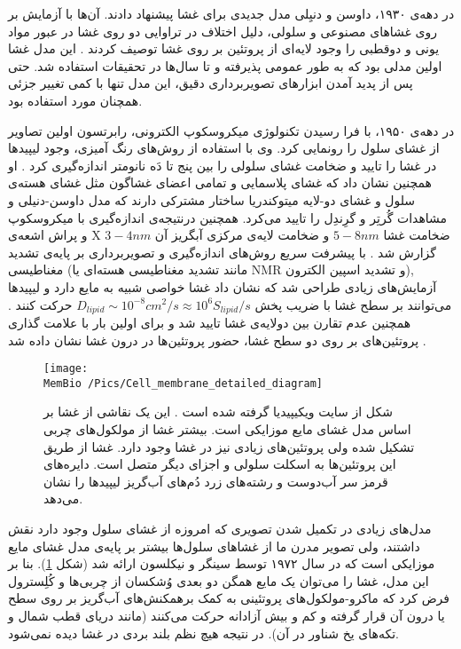 در دهه‌ی ۱۹۳۰، داوسن 
و دنیِلی 
مدل جدیدی برای غشا پیشنهاد دادند. آن‌ها با آزمایش بر روی غشا‌های مصنوعی و سلولی، دلیل اختلاف در تراوایی دو روی غشا در عبور مواد یونی و دوقطبی را وجود لایه‌ای از پروتئین بر روی غشا توصیف کردند
\cite{Danielli1935}. 
این مدل غشا اولین مدلی بود که به طور عمومی پذیرفته  و تا سال‌ها  در تحقیقات استفاده شد. حتی پس از  پدید آمدن ابزار‌های تصویر‌برداری دقیق، این مدل تنها با کمی تغییر جزئی همچنان مورد استفاده بود.

در دهه‌ی ۱۹۵۰، با فرا رسیدن تکنولوژی میکروسکوپ الکترونی، رابرتسون
 اولین تصاویر از غشای سلول را رونمایی کرد. وی با استفاده از روش‌های رنگ آمیزی، وجود لیپید‌ها
 در غشا را تایید و ضخامت غشای سلولی را بین پنج تا دَه نانومتر اندازه‌گیری کرد
\cite{ROBERTSON1959aa}.
او همچنین نشان داد که غشای پلاسمایی و تمامی اعضای غشاگون مثل غشای هسته‌ی سلول و غشای دو-لایه میتوکندریا
ساختار مشترکی دارند که مدل داوسن-دنیلی و مشاهدات گُرتِر و گرِندِل را تایید می‌کرد.
همچنین درنتیجه‌ی اندازه‌گیری با میکروسکوپ و پراش اشعه‌ی X ضخامت غشا 
 $5-8nm$
و ضخامت لایه‌ی مرکزی آبگریز آن
 $3-4nm$
گزارش شد
\cite{NelsonBook2004}.
با پیشرفت سریع روش‌های اندازه‌گیری و تصویربرداری بر پایه‌ی تشدید مغناطیسی (مانند تشدید مغناطیسی‌ هسته‌ای یا NMR
و تشدید اسپین الکترون), آزمایش‌های زیادی طراحی شد که نشان داد غشا  خواصی شبیه به مایع دارد
\cite{Edidin2003}
و لیپید‌ها می‌توانند بر سطح غشا با ضریب پخش
$D_{lipid}\sim 10^{-8}cm^2/s\approx 10^6S_{lipid}/s$
 حرکت کنند
\cite{NelsonBook2004,Chapman1975}.
همچنین عدم تقارن بین دولایه‌ی غشا تایید شد و برای اولین بار با علامت گذاری پروتئین‌های بر روی دو سطح غشا، حضور پروتئین‌ها در درون غشا نشان داده شد
\cite{Bretscher1973}.

\begin{figure}[t]
\begin{center}
\texttt{[image: \\MemBio /Pics/Cell\_membrane\_detailed\_diagram]}
\caption{
شکل از سایت ویکیپیدیا گرفته شده است
\cite{wikiCellMembrane}. این یک نقاشی از غشا بر اساس مدل غشای مایع موزایکی است. بیشتر غشا از مولکول‌های چربی تشکیل شده ولی پروتئین‌های زیادی نیز در غشا وجود دارد.  غشا از طریق این پروتئین‌ها به اسکلت سلولی و اجزای دیگر متصل است. دایره‌های قرمز سر آب‌دوست و رشته‌های زرد دُم‌های آب‌گریز لیپید‌ها را نشان می‌دهد.
}
\label{fig:fluidmembranemodel}
\end{center}
\end{figure}

مدل‌های زیادی در تکمیل شدن تصویری که امروزه از غشای سلول وجود دارد نقش داشتند، ولی تصویر مدرن ما از غشاهای سلول‌ها بیشتر بر پایه‌ی مدل غشای مایع موزایکی‌
 است که در سال ۱۹۷۲ توسط سینگر
  و نیکلسون
 ارائه شد
\cite{Singer1972}
(شکل 
\ref{fig:fluidmembranemodel}). بنا بر این مدل، غشا را می‌توان یک مایع همگن دو بعدی وُشکسان از چربی‌ها و کُلِسترول فرض کرد که ماکرو-مولکول‌های پروتئینی به کمک برهمکنش‌های آب‌گریز  بر روی سطح یا درون آن قرار گرفته و کم و بیش آزادانه حرکت می‌کنند (مانند دریای قطب شمال و تکه‌های یخ  شناور در آن).  در نتیجه هیچ نظم بلند بردی در غشا دیده نمی‌شود. 




